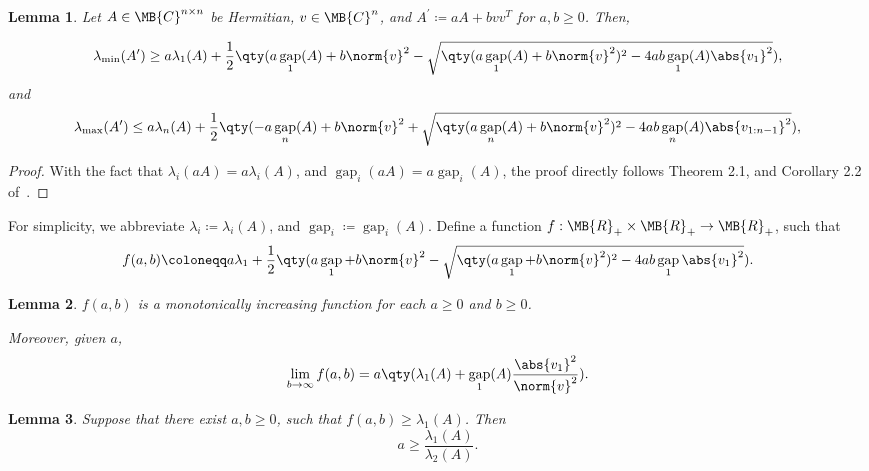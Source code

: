 \documentclass[nobib]{my-handout}
\newtheorem{lemma}{Lemma}
\theoremstyle{definition}
\theoremstyle{remark}
\DeclareMathOperator{\gap}{gap}
\begin{document}
\begin{lemma}\label{lem:ipsen_eigenvalue_bounds}
	Let $A \in \MB{C}^{n \times n}$ be Hermitian, $v \in \MB{C}^n$, and $A^\prime
	\coloneqq a A + b v v^T$ for $a, b \ge 0$. Then,
	\begin{fullwidth}
		\begin{equation}
			\lambda_{\min}(A^\prime)
			\ge a \lambda_1(A) + \frac{1}{2} \qty(a \gap_1(A) + b \norm{v}^2 -
			\sqrt{\qty(a \gap_1(A) + b \norm{v}^2)^2 - 4 a b \gap_1(A) \abs{v_1}^2}),
		\end{equation}
		and
		\begin{equation}
			\lambda_{\max}(A^\prime)
			\le a \lambda_n(A) + \frac{1}{2} \qty(- a \gap_n(A) + b \norm{v}^2 
			+ \sqrt{\qty(a \gap_n(A) + b \norm{v}^2)^2 - 4 a b \gap_n(A)
			\abs{v_{1:n-1}}^2}),
		\end{equation}
	\end{fullwidth}
	\end{lemma}

\begin{proof}
	With the fact that $\lambda_i(a A) = a \lambda_i(A)$, and $\gap_i(a A) = a
	\gap_i(A)$, the proof directly follows Theorem 2.1, and Corollary 2.2
	of~\cite{ipsen_refined_2009}.
\end{proof}

For simplicity, we abbreviate $\lambda_i \coloneqq \lambda_i(A)$, and $\gap_i
\coloneqq \gap_i(A)$.  Define a function $f : \MB{R}_{+} \times
\MB{R}_{+} \to \MB{R}_{+}$, such that
\begin{equation}\label{eq:function_of_lmin_lbound}
	f(a,b) \coloneqq
	a \lambda_1 + \frac{1}{2} \qty(a \gap_1 + b \norm{v}^2 - \sqrt{\qty(a
	\gap_1 + b \norm{v}^2)^2 - 4 ab \gap_1 \abs{v_1}^2}).
\end{equation}

\begin{lemma}
	$f(a, b)$ is a monotonically increasing function for each $a \ge 0$ and $b
	\ge 0$.

	Moreover, given $a$,
	\begin{equation*}
		\lim_{b \to \infty} f(a, b) = a \qty(\lambda_1(A) + \gap_1(A)
		\frac{\abs{v_1}^2}{\norm{v}^2}).
	\end{equation*}
\end{lemma}

\begin{lemma}
	Suppose that there exist $a, b \ge 0$, such that $f(a, b) \ge
	\lambda_1(A)$. Then
	\begin{equation}\label{eq:neccessary_cond_for_a}
		a \ge \frac{\lambda_1(A)}{\lambda_2(A)}.
	\end{equation}
\end{lemma}
\end{document}
